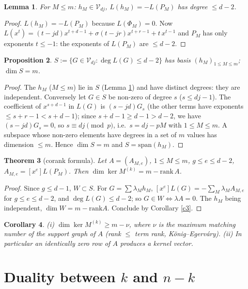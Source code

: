 \documentclass[11pt,a4paper]{article}
\newtheorem{thm}{Theorem}
\newtheorem{prop}[thm]{Proposition}
\newtheorem{lem}[thm]{Lemma}
\newtheorem{cor}[thm]{Corollary}
\theoremstyle{remark}\newtheorem*{rem}{Remark}
\newcommand{\V}{\mathcal V}
\begin{document}
\begin{lem}\label{l4} For $M\le m$: $h_M\in\V_{dj}$, $L(h_M)=-L(P_M)$ has degree $\le d-2$.\end{lem}
\begin{proof} $L(h_M)=-L(P_M)$ because $L(\Phi_M)=0$. Now $L(x^{t})=(t-jd)x^{t+d-1}+\sigma(t-jr)x^{t+r-1}+t\,x^{t-1}$ and $P_M$ has only exponents $t\le-1$: the exponents of $L(P_M)$ are $\le d-2$.\end{proof}

\begin{prop}\label{p5} $S:=\{G\in\V_{dj}:\deg L(G)\le d-2\}$ has basis $(h_M)_{1\le M\le m}$; $\dim S=m$.\end{prop}
\begin{proof} The $h_M$ ($M\le m$) lie in $S$ (Lemma \ref{l4}) and have distinct degrees: they are independent. Conversely let $G\in S$ be non-zero of degree $s$ ($s\le dj-1$). The coefficient of $x^{s+d-1}$ in $L(G)$ is $(s-jd)G_s$ (the other terms have exponents $\le s+r-1<s+d-1$); since $s+d-1\ge d-1>d-2$, we have $(s-jd)G_s=0$, so $s\equiv dj\pmod p$, i.e.\ $s=dj-pM$ with $1\le M\le m$. A subspace whose non-zero elements have degrees in a set of $m$ values has dimension $\le m$. Hence $\dim S=m$ and $S=\mathrm{span}(h_M)$.\end{proof}

\begin{thm}[corank formula]\label{t6} Let $A=(A_{M,e})$, $1\le M\le m$, $g\le e\le d-2$, $A_{M,e}=[x^e]L(P_M)$. Then $\dim\ker M^{(k)}=m-\mathrm{rank}\,A$.\end{thm}
\begin{proof} Since $g\le d-1$, $W\subset S$. For $G=\sum\lambda_Mh_M$, $[x^e]L(G)=-\sum_M\lambda_MA_{M,e}$ for $g\le e\le d-2$, and $\deg L(G)\le d-2$; so $G\in W\iff\lambda A=0$. The $h_M$ being independent, $\dim W=m-\mathrm{rank}A$. Conclude by Corollary \ref{c3}.\end{proof}

\begin{cor}\label{c7} (i) $\dim\ker M^{(k)}\ge m-\nu$, where $\nu$ is the maximum matching number of the support graph of $A$ (rank $\le$ term rank, K\"onig--Egerv\'ary). (ii) In particular an identically zero row of $A$ produces a kernel vector.\end{cor}

\section{Duality between $k$ and $n-k$}
\end{document}
